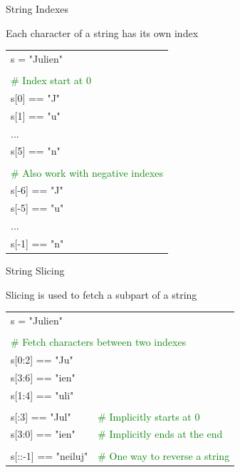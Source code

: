 \documentclass[serif, aspectratio=169]{beamer}
\newcommand{\tgreen}[1]{\textcolor{green}{#1}}
\newenvironment{CLI} %
    {
    \noindent
    \ttfamily 
    \footnotesize
    \begin{tcolorbox}[colback=gray!150,colframe=black]
    \color{white}
    \begin{tabular}{p{4.5cm}p{7.5cm}}
    }
    { 
    \end{tabular}
    \end{tcolorbox}
    }
\begin{document}
\begin{frame}{String Indexes}
    \begin{block}{Each character of a string has its own index}
        \vspace{2pt}
        \begin{CLI}
            s = "Julien" \\
            \pause
            & \\
            \tgreen{\# Index start at 0} & \\
            s[0] == "J" & \\
            s[1] == "u" & \\
            ... & \\
            s[5] == "n" & \\
            \pause
            & \\
            \multicolumn{2}{l}{\tgreen{\# Also work with negative indexes}} \\
            s[-6] == "J" & \\
            s[-5] == "u" & \\
            ... & \\
            s[-1] == "n" & \\
        \end{CLI}
    \end{block}
\end{frame}

\begin{frame}{String Slicing}
    \begin{block}{Slicing is used to fetch a subpart of a string}
        \vspace{2pt}
        \begin{CLI}
            s = "Julien" & \\
            \pause
            & \\
            \multicolumn{2}{l}{\tgreen{\# Fetch characters between two indexes}} \\
            s[0:2] == "Ju" & \\
            s[3:6] == "ien" & \\
            s[1:4] == "uli" & \\
            \pause
            & \\
            s[:3] == "Jul" & \tgreen{\# Implicitly starts at 0} \\
            s[3:0] == "ien" & \tgreen{\# Implicitly ends at the end} \\
            \pause
            & \\
            s[::-1] == "neiluj" & \tgreen{\# One way to reverse a string} \\
        \end{CLI}
    \end{block}
\end{frame}
\end{document}
